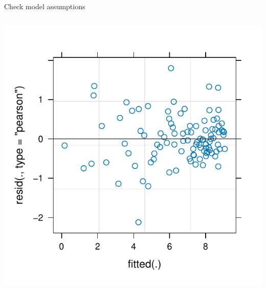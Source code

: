 \documentclass[aspectratio=169]{beamer}
\begin{document}
\begin{frame}[fragile]{Check model assumptions}
\begin{columns}
\begin{column}{.5\textwidth}
\begin{center}
      \includegraphics[scale=.55]{../figures/icon-residplot}
      \end{center}
    \end{column}
  \end{columns}
\end{frame}

\end{document}

